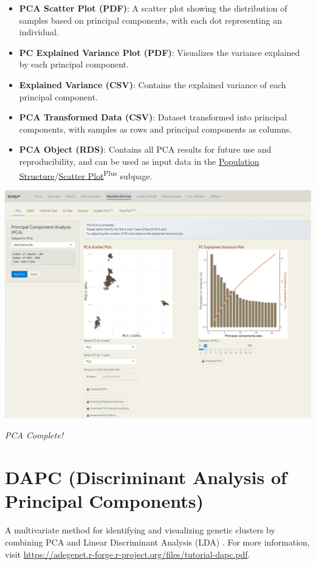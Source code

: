 \documentclass[
]{book}
\begin{document}
\begin{itemize}
\item
  \textbf{PCA Scatter Plot (PDF)}: A scatter plot showing the distribution of samples based on principal components, with each dot representing an individual.
\item
  \textbf{PC Explained Variance Plot (PDF)}: Visualizes the variance explained by each principal component.
\item
  \textbf{Explained Variance (CSV)}: Contains the explained variance of each principal component.
\item
  \textbf{PCA Transformed Data (CSV)}: Dataset transformed into principal components, with samples as rows and principal components as columns.
\item
  \textbf{PCA Object (RDS)}: Contains all PCA results for future use and reproducibility, and can be used as input data in the \ul{Population Structure}/\ul{Scatter Plot}\textsuperscript{Plus} subpage.
\end{itemize}

\includegraphics{images/clipboard-534056671.png}

\emph{PCA Complete!}

\section{DAPC (Discriminant Analysis of Principal Components)}\label{dapc-discriminant-analysis-of-principal-components}

A multivariate method for identifying and visualizing genetic clusters by combining PCA and Linear Discriminant Analysis (LDA) \citep{jombart2010}. For more information, visit \url{https://adegenet.r-forge.r-project.org/files/tutorial-dapc.pdf}.
\end{document}
